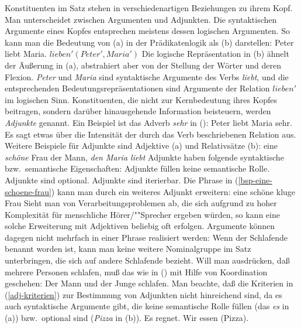 Konstituenten im Satz stehen in verschiedenartigen Beziehungen zu ihrem Kopf.
Man unterscheidet zwischen Argumenten und Adjunkten. Die syntaktischen Argumente
eines Kopfes entsprechen meistens dessen logischen Argumenten. So kann man
die Bedeutung von (a) in der Prädikatenlogik als (b) darstellen:
\eal
\ex Peter liebt Maria.
\ex $lieben'(Peter', Maria')$
\zl
Die logische Repräsentation in (b) ähnelt der Äußerung in (a),
abstrahiert aber von der Stellung der Wörter und deren Flexion.
\emph{Peter} und \emph{Maria} sind syntaktische Argumente des Verbs \emph{liebt},
und die entsprechenden Bedeutungsrepräsentationen sind Argumente der Relation $lieben'$
im logischen Sinn. 
Konstituenten, die nicht zur Kernbedeutung ihres Kopfes beitragen,
sondern darüber hinausgehende Information beisteuern, werden \emph{Adjunkte}
genannt. Ein Beispiel ist das Adverb \emph{sehr} in ():
\ea
Peter liebt Maria sehr.
\z
Es sagt etwas über die Intensität der durch das Verb beschriebenen Relation aus.
Weitere Beispiele für Adjunkte sind Adjektive (a) und Relativsätze (b):
\eal
\ex\label{bsp-eine-schoene-frau}
eine {\em schöne\/} Frau
\ex der Mann, {\em den Maria liebt\/}
\zl
Adjunkte haben folgende syntaktische bzw.\ semantische Eigenschaften:
\eal
\label{adj-kriterien}
\ex Adjunkte füllen keine semantische Rolle.
\ex Adjunkte sind optional.
\ex Adjunkte sind iterierbar.
\zl
Die Phrase in (\ref{bsp-eine-schoene-frau}) kann man durch ein weiteres Adjunkt erweitern:
\ea
eine schöne kluge Frau
\z
Sieht man von Verarbeitungsproblemen ab, die sich aufgrund zu hoher Komplexität
für menschliche Hörer/""Sprecher ergeben würden, so kann eine solche Erweiterung
mit Adjektiven beliebig oft erfolgen. Argumente können dagegen nicht mehrfach 
in einer Phrase realisiert werden:
\z
Wenn der Schlafende benannt worden ist, kann man keine weitere Nominalgruppe
im Satz unterbringen, die sich auf andere Schlafende bezieht. Will man ausdrücken,
daß mehrere Personen schlafen, muß das wie in () mit Hilfe von
Koordination geschehen:
\ea
Der Mann und der Junge schlafen.
\z
Man beachte, daß die Kriterien in (\ref{adj-kriterien}) zur Bestimmung von Adjunkten
nicht hinreichend sind, da es auch syntaktische
Argumente gibt, die keine semantische Rolle füllen (das \emph{es} in (a)) bzw.\ optional
sind (\emph{Pizza} in (b)).
\eal
\ex Es regnet.
\ex Wir essen (Pizza).
\zl

